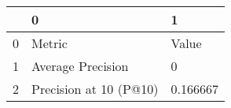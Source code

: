 \begin{tabular}{lll}
\toprule
 & 0 & 1 \\
\midrule
0 & Metric & Value \\
1 & Average Precision & 0 \\
2 & Precision at 10 (P@10) & 0.166667 \\
\bottomrule
\end{tabular}
